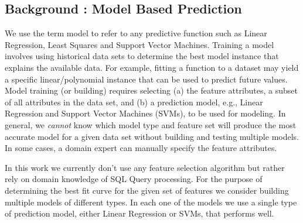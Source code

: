 \documentclass{article}
\begin{document}
\begin{multicols}{2}
	\section{Background : Model Based Prediction}	
	We use the term model to refer to any predictive function such as
	Linear Regression, Least Squares and Support Vector Machines.
	Training a model involves using historical data sets to determine the
	best model instance that explains the available data. For example,
	fitting a function to a dataset may yield a specific linear/polynomial
	instance that can be used to predict future values.
	Model training (or building) requires selecting (a) the feature attributes, 
	a subset of all attributes in the data set, and (b) a prediction model, 
	e.g., Linear Regression and Support Vector Machines
	(SVMs), to be used for modeling. In general, we \textit{cannot} know
	which model type and feature set will produce the most accurate
	model for a given data set without building and testing multiple
	models. In some cases, a domain expert can manually specify the
	feature attributes. 
	

	In this work we currently don't use any feature selection algorithm but rather rely on domain 
knowledge of SQL Query processing. For the purpose of determining the best fit curve for the given set of features we consider building multiple models of different types. In each one of the models we use a single type of prediction model, either Linear Regression or SVMs, that performs well.


\end{multicols}
\end{document}
